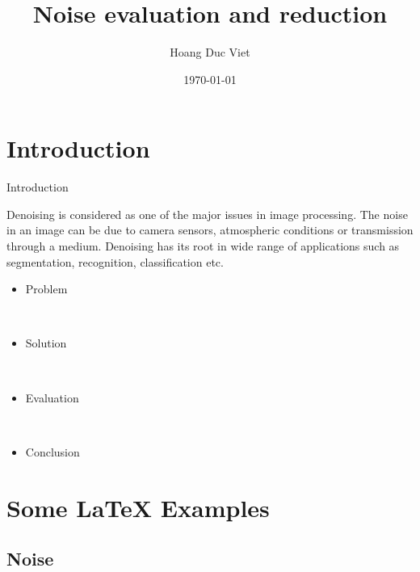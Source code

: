 \documentclass{beamer}
\title[Your Short Title]{Noise evaluation and reduction}
\author{Hoang Duc Viet}
\institute{ICT Lab}
\date{\today}
\begin{document}
\begin{frame}
  \titlepage
\end{frame}


\section{Introduction}

\begin{frame}{Introduction}

Denoising is considered as one of the major issues in image processing.
The noise in an image can be due to camera sensors, atmospheric conditions or transmission through a medium. Denoising has its root in wide range of applications such as segmentation, recognition, classification etc.
\vspace{1cm} 
\begin{itemize}
  \item Problem
  
  \
  
  \item Solution
  
  \
  
  \item Evaluation
  
  \
  
  \item Conclusion
\end{itemize}



\end{frame}

\section{Some \LaTeX{} Examples}

\subsection{Noise}
\end{document}
